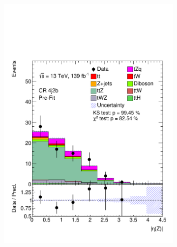 \begin{figure}[h!]
\begin{subfigure}[b]{0.32\linewidth}
    \includegraphics[width=\linewidth]{ubonn-thesis/Chapters/Chapters_05/Figure/CR_ttZ/CR_4j2b_Z_eta.pdf} 
  \end{subfigure}%
  \begin{subfigure}[b]{0.32\linewidth}
    \centering

\end{subfigure}
\end{figure}

